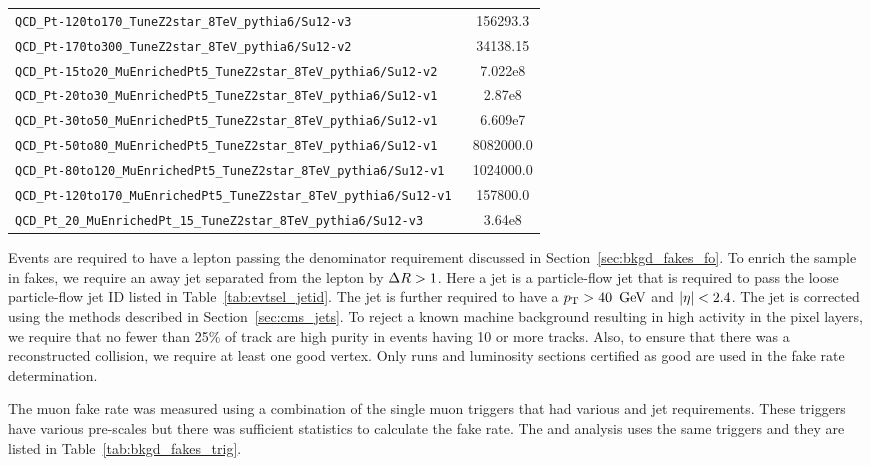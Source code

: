 \begin{table}[!hbt]
{\begin{minipage}{\textwidth}
\begin{tabular}{lc}
{\tt QCD\_Pt-120to170\_TuneZ2star\_8TeV\_pythia6/Su12-v3                } & 156293.3          \\
{\tt QCD\_Pt-170to300\_TuneZ2star\_8TeV\_pythia6/Su12-v2                } & 34138.15          \\
{\tt QCD\_Pt-15to20\_MuEnrichedPt5\_TuneZ2star\_8TeV\_pythia6/Su12-v2   } & 7.022e8           \\
{\tt QCD\_Pt-20to30\_MuEnrichedPt5\_TuneZ2star\_8TeV\_pythia6/Su12-v1   } & 2.87e8            \\
{\tt QCD\_Pt-30to50\_MuEnrichedPt5\_TuneZ2star\_8TeV\_pythia6/Su12-v1   } & 6.609e7           \\
{\tt QCD\_Pt-50to80\_MuEnrichedPt5\_TuneZ2star\_8TeV\_pythia6/Su12-v1   } & 8082000.0         \\
{\tt QCD\_Pt-80to120\_MuEnrichedPt5\_TuneZ2star\_8TeV\_pythia6/Su12-v1  } & 1024000.0         \\
{\tt QCD\_Pt-120to170\_MuEnrichedPt5\_TuneZ2star\_8TeV\_pythia6/Su12-v1 } & 157800.0          \\
{\tt QCD\_Pt\_20\_MuEnrichedPt\_15\_TuneZ2star\_8TeV\_pythia6/Su12-v3   } & 3.64e8            \\
\hline\hline
\end{tabular}
\end{minipage}
}
\end{table}

Events are required to have a lepton passing the denominator requirement
discussed in Section~\ref{sec:bkgd_fakes_fo}. To enrich the sample in fakes,
we require an away jet separated from the lepton by $\Delta R > 1$. Here a jet is
a particle-flow jet that is required to pass the loose particle-flow jet ID
listed in Table~\ref{tab:evtsel_jetid}. The jet is further required to have
a $\pt > 40\ \GeV$ and $\left|\eta\right| < 2.4$. The jet \pt is corrected using the methods
described in Section~\ref{sec:cms_jets}. To reject a known machine background
resulting in high activity in the pixel layers, we require that no fewer than
25\% of track are high purity in events having 10 or more tracks. Also, to
ensure that there was a reconstructed collision, we require at least one good
vertex. Only runs and luminosity sections certified as good are used in the
fake rate determination.

The muon fake rate was measured using a combination of the single muon
triggers that had various \pt and jet requirements. These triggers have
various pre-scales but there was sufficient statistics to calculate the fake rate.
The \hpt and \lpt analysis uses the same triggers and they are listed in
Table~\ref{tab:bkgd_fakes_trig}.

